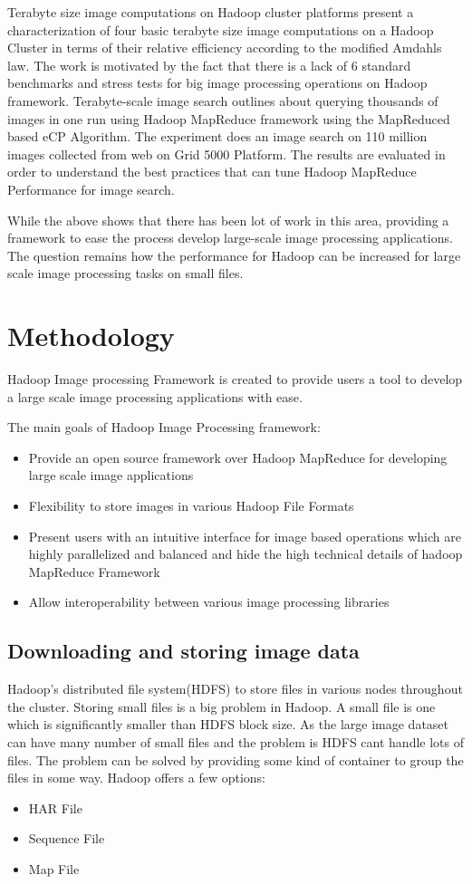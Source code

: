 \documentclass[conference]{IEEEtran}
\begin{document}
	Terabyte size image computations on Hadoop cluster \cite{Bajcsy2013} platforms present a characterization of four basic terabyte size image computations on a Hadoop Cluster in terms of their relative efficiency according to the modified Amdahls law. The work is motivated by the fact that there is a lack of 6 standard benchmarks and stress tests for big image processing operations on Hadoop framework. Terabyte-scale image search\cite{Moise2013} outlines about querying thousands of images in one run using Hadoop MapReduce framework using the MapReduced based eCP Algorithm. The experiment does an image search on 110 million images collected from web on Grid 5000 Platform. The results are evaluated in order to understand the best practices that can tune Hadoop MapReduce Performance for image search.	
	
	While the above shows that there has been lot of work in this area, providing a framework to ease the process develop large-scale image processing applications. The question remains how the performance for Hadoop can be increased for large scale image processing tasks on small files.
	
\section{Methodology}
Hadoop Image processing Framework is created to provide users a tool to develop a large scale image processing applications with ease.

The main goals of Hadoop Image Processing framework:
\begin{itemize}
	\item Provide an open source framework over Hadoop MapReduce for developing large scale image applications 
	\item Flexibility to store images in various Hadoop File Formats
	\item Present users with an intuitive interface for image based operations which are highly parallelized and balanced and hide the high technical details of hadoop MapReduce Framework
	\item Allow interoperability between various image processing libraries
\end{itemize}

\subsection{Downloading and storing image data}
Hadoop's distributed file system(HDFS) to store files in various nodes throughout the cluster. Storing small files\cite{White2009} is a big problem in Hadoop. A small file is one which is significantly smaller than HDFS block size. As the large image dataset can have many number of small files and the problem is HDFS cant handle lots of files. The problem can be solved by providing some kind of container to group the files in some way. Hadoop offers a few options:
\begin{itemize}
	\item HAR File
	\item Sequence File
	\item Map File
\end{itemize}
\end{document}
